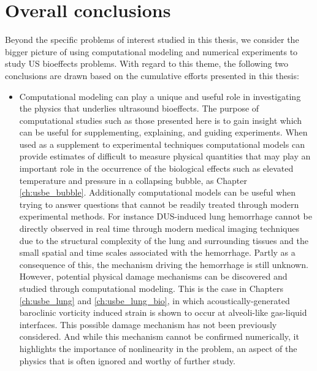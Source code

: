\section{Overall conclusions}
Beyond the specific problems of interest studied in this thesis, we
consider the bigger picture of using computational modeling and
numerical experiments to study \ac{US} bioeffects problems. With
regard to this theme, the following two conclusions are drawn based on
the cumulative efforts presented in this thesis:
\begin{itemize}
\item Computational modeling can play a unique and useful role in
  investigating the physics that underlies ultrasound bioeffects. The
  purpose of computational studies such as those presented here is to
  gain insight which can be useful for supplementing, explaining, and
  guiding experiments. When used as a supplement to experimental
  techniques computational models can provide estimates of difficult
  to measure physical quantities that may play an important role in
  the occurrence of the biological effects such as elevated
  temperature and pressure in a collapsing bubble, as Chapter
  \ref{ch:usbe_bubble}. Additionally computational models can be
  useful when trying to answer questions that cannot be readily
  treated through modern experimental methods. For instance
  \ac{DUS}-induced lung hemorrhage cannot be directly observed in real
  time through modern medical imaging techniques due to the structural
  complexity of the lung and surrounding tissues and the small spatial
  and time scales associated with the hemorrhage. Partly as a
  consequence of this, the mechanism driving the hemorrhage is still
  unknown. However, potential physical damage mechanisms can be
  discovered and studied through computational modeling. This is the
  case in Chapters \ref{ch:usbe_lung} and \ref{ch:usbe_lung_bio}, in
  which acoustically-generated baroclinic vorticity induced strain is
  shown to occur at alveoli-like gas-liquid interfaces. This possible
  damage mechanism has not been previously considered. And while this
  mechanism cannot be confirmed numerically, it highlights the
  importance of nonlinearity in the problem, an aspect of the physics
  that is often ignored and worthy of further study.
  \begin{comment}
    The potential of computational modeling to answer questions of
    ultrasound bioeffects can only be realized if the models
    themselves hold at least qualitatively true to reality within the
    regimes of interest, which leads us to our next conclusion.
  \end{comment}


\end{itemize}
